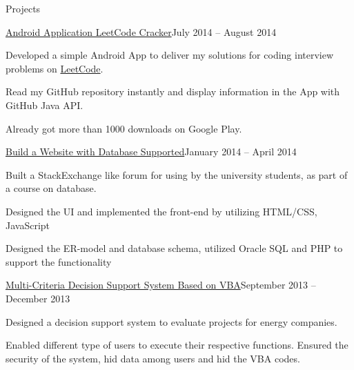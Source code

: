 \documentclass{resume} %
\begin{document}
\begin{rSection}{Projects}
\begin{rSubsection}{\href{https://play.google.com/store/apps/details?id=me.zhujiaqi.leetcode&hl=en}{Android Application LeetCode Cracker}}{July 2014 -- August 2014}{}{}
\item Developed a simple Android App to deliver my solutions for coding interview problems on \href{https://leetcode.com/}{LeetCode}.
\item Read my GitHub repository instantly and display information in the App with GitHub Java API.
\item Already got more than 1000 downloads on Google Play.
\end{rSubsection}
\begin{rSubsection}{\href{https://github.com/anuragsoni/AskAlbert}{Build a Website with Database Supported}}{January 2014 -- April 2014}{}{}
\item Built a StackExchange like forum for using by the university students, as part of a course on 
database.
\item Designed the UI and implemented the front-end by utilizing HTML/CSS, JavaScript
\item Designed the ER-model and database schema, utilized Oracle SQL and PHP to support the functionality 
\end{rSubsection}
\begin{rSubsection}{\href{https://drive.google.com/folderview?id=0B72jE2yMNz2wdU9VanNpZUFXS3M&usp=sharing}{Multi-Criteria Decision Support System Based on VBA}}{September 2013 -- December 2013}{}{}
\item Designed a decision support system to evaluate projects for energy companies.
\item Enabled different type of users to execute their respective functions. Ensured the security of the system, hid data among users and hid the VBA codes.

\end{rSubsection}
\end{rSection}
\end{document}
